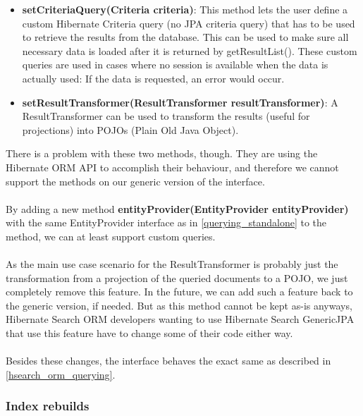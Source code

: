 \begin{itemize}
	\item \textbf{setCriteriaQuery(Criteria criteria)}:
		This method lets the user define a custom Hibernate Criteria query (no JPA criteria query) that has to be used to retrieve the results from the database. This can be used to make sure all necessary data is loaded after it is returned by getResultList(). These custom queries are  used in cases where no session is available when the data is actually used: If the data is requested, an error would occur.
	\item \textbf{setResultTransformer(ResultTransformer resultTransformer)}:
		A ResultTransformer can be used to transform the results (useful for projections) into POJOs (Plain Old Java Object).
\end{itemize}
\noindent
There is a problem with these two methods, though. They are using the Hibernate ORM API to accomplish their behaviour, and therefore we cannot support the methods on our generic version of the interface.
\\\\
By adding a new method \textbf{entityProvider(EntityProvider entityProvider)} with the same EntityProvider interface as in \ref{querying_standalone} to the method, we can at least support custom queries.
\\\\
As the main use case scenario for the ResultTransformer is probably just the transformation from a projection of the queried documents to a POJO, we just completely remove this feature. In the future, we can add such a feature back to the generic version, if needed. But as this method cannot be kept as-is anyways, Hibernate Search ORM developers wanting to use Hibernate Search GenericJPA that use this feature have to change some of their code either way.
\\\\
Besides these changes, the interface behaves the exact same as described in \ref{hsearch_orm_querying}.

\pagebreak

\subsubsection{Index rebuilds}

